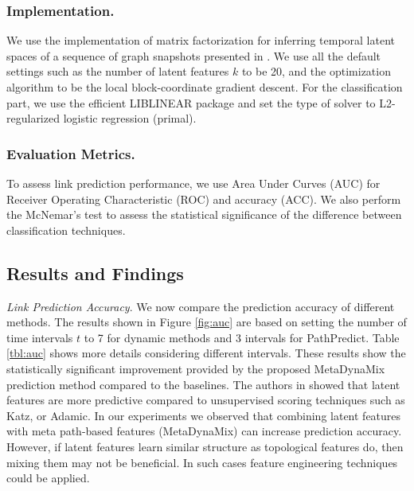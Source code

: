 \subsubsection{Implementation.} We use the implementation of matrix factorization for inferring temporal latent spaces of a sequence of graph snapshots presented in \cite{Zhu2016}. We use all the default settings such as the number of latent features $k$ to be 20, and the optimization algorithm to be the local block-coordinate gradient descent. For the classification part, we use the efficient LIBLINEAR \cite{fan2008liblinear} package and set the type of solver to L2-regularized logistic regression (primal). %


\subsubsection{Evaluation Metrics.} 

To assess link prediction performance, we use Area Under Curves (AUC) for Receiver Operating Characteristic (ROC) \cite{davis2006relationship} %
and accuracy (ACC). %
We also perform the McNemar's test \cite{mcnemar1947note} to assess the statistical significance of the difference between classification techniques.

\subsection{Results and Findings}

\textit{Link Prediction Accuracy}. We now compare the prediction accuracy of different methods. The  results shown in Figure \ref{fig:auc} are based on setting the number of time intervals $t$ to 7 for dynamic methods and 3 intervals for PathPredict. Table \ref{tbl:auc} shows more details considering different intervals. These results show the statistically significant improvement provided by the proposed MetaDynaMix prediction method compared to the baselines. The authors in \cite{menon2011link,Zhu2016} showed that latent features are more predictive compared to unsupervised scoring techniques such as Katz, or Adamic. In our experiments we observed that combining latent features with meta path-based features (MetaDynaMix) can increase prediction accuracy. However, if latent features learn similar structure as topological features do, then mixing them may not be beneficial. In such cases feature engineering techniques could be applied. 

